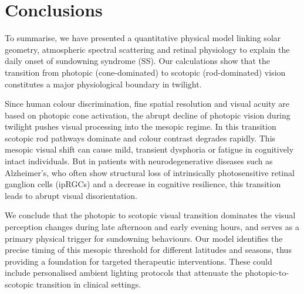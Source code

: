\documentclass[brainsci,article,submit,moreauthors]{Definitions/mdpi}
\begin{document}
\section{Conclusions}

To summarise, we have presented a quantitative physical model linking solar geometry, atmospheric spectral scattering and retinal physiology to explain the daily onset of sundowning syndrome (SS). Our calculations show that the transition from photopic (cone-dominated) to scotopic (rod-dominated) vision constitutes a major physiological boundary in twilight.

Since human colour discrimination, fine spatial resolution and visual acuity are based on photopic cone activation, the abrupt decline of photopic vision during twilight pushes visual processing into the mesopic regime. In this transition scotopic rod pathways dominate and colour contrast degrades rapidly. This mesopic visual shift can cause mild, transient dysphoria or fatigue in cognitively intact individuals. But in patients with neurodegenerative diseases such as Alzheimer's, who often show structural loss of intrinsically photosensitive retinal ganglion cells (ipRGCs) and a decrease in cognitive resilience, this transition leads to abrupt visual disorientation.

We conclude that the photopic to scotopic visual transition dominates the visual perception changes during late afternoon and early evening hours, and serves as a primary physical trigger for sundowning behaviours. Our model identifies the precise timing of this mesopic threshold for different latitudes and seasons, thus providing a foundation for targeted therapeutic interventions. These could include personalised ambient lighting protocols that attenuate the photopic-to-scotopic transition in clinical settings.

\vspace{6pt}





\end{document}

